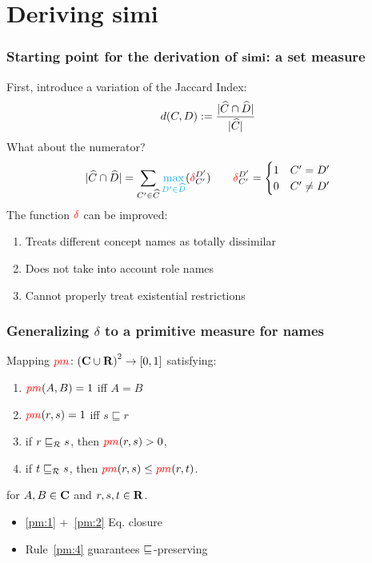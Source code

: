 \documentclass[smaller]{beamer}
\begin{document}
\section{Deriving simi}

\begin{frame}
  \frametitle{Starting point for the derivation of \(\operatorname{\mathbf{simi}}\): a set measure}
  First, introduce a variation of the \alert{Jaccard Index}:
  \begin{equation}
    d(C,D) := \frac{\abs{\atom{C} \cap \atom{D}}}%
                   {\abs{\atom{C}}}
  \end{equation}
  What about the numerator?
  \begin{equation}
    \abs{\atom{C} \cap \atom{D}} =
    \sum_{C^\prime \in \atom{C}}%
      \textcolor{cyan}{\max_{D^\prime \in \atom{D}}}%
      (\textcolor{red}{\delta}_{C^\prime}^{D^\prime})
    \qquad \textcolor{red}{\delta}_{C^\prime}^{D^\prime}
    = \begin{cases}
      1 & C^\prime = D^\prime \\ 0 & C^\prime \ne D^\prime
    \end{cases}
  \end{equation}
  \pause
  The function \(\textcolor{red}{\delta}\) can be improved:
  \begin{enumerate}[<+->]
    \item Treats different concept names as totally dissimilar
    \item Does not take into account role names
    \item Cannot properly treat existential restrictions
  \end{enumerate}
\end{frame}

\begin{frame}
  \frametitle{Generalizing \(\delta{}\) to a primitive measure for names}
  \begin{definition}
    Mapping \(\textcolor{red}{pm} \colon {(\mathbf{C}\cup \mathbf{R})}^2 \to [0,1]\)
    satisfying:
    \begin{enumerate}[<+->]
      \item\label{pm:1} \(\textcolor{red}{pm}(A,B) = 1\) iff \(A = B\)
      \item\label{pm:2} \(\textcolor{red}{pm}(r,s) = 1\) iff \(s \sqsubseteq r\)
      \item\label{pm:3} if \(r \sqsubseteq_{\mathcal{R}} s\), then \(\textcolor{red}{pm}(r,s) > 0\),
      \item\label{pm:4} if \(t \sqsubseteq_{\mathcal{R}} s\), then \(\textcolor{red}{pm}(r,s) \le \textcolor{red}{pm}(r,t)\).
    \end{enumerate}
    for \(A,B \in \mathbf{C}\) and \(r,s,t \in \mathbf{R}\).
  \end{definition}
  \begin{itemize}[<+->]
    \item \ref{pm:1} +~\ref{pm:2} \textrightarrow Eq. closure
    \item Rule~\ref{pm:4} guarantees
    \(\sqsubseteq_{\mathcal{}}\)-preserving
  \end{itemize}
\end{frame}
\end{document}
